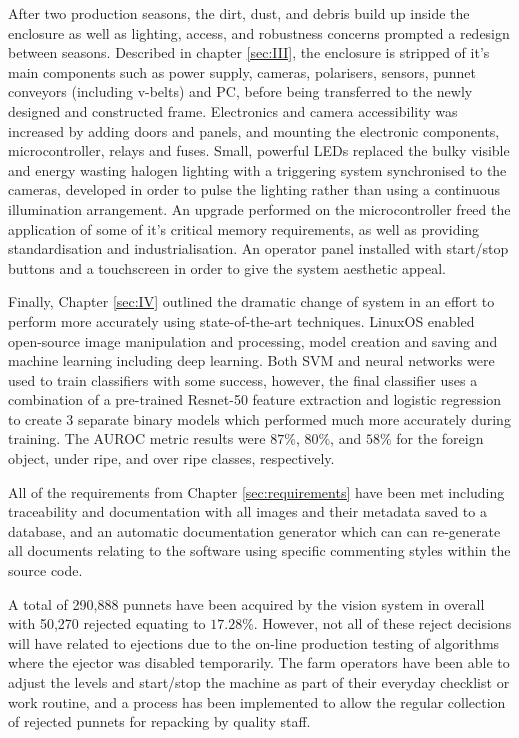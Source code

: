 \documentclass[fleqn,twoside,12pt]{report}
\begin{document}
After two production seasons, the dirt, dust, and debris build up inside the enclosure as well as lighting, access, and robustness concerns prompted a redesign between seasons. Described in chapter \ref{sec:III}, the enclosure is stripped of it's main components such as power supply, cameras, polarisers, sensors, punnet conveyors (including v-belts) and PC, before being transferred to the newly designed and constructed frame. Electronics and camera accessibility was increased by adding doors and panels, and mounting the electronic components, microcontroller, relays and fuses. Small, powerful LEDs replaced the bulky visible and energy wasting halogen lighting with a triggering system synchronised to the cameras, developed in order to pulse the lighting rather than using a continuous illumination arrangement. An upgrade performed on the microcontroller freed the application of some of it's critical memory requirements, as well as providing standardisation and industrialisation. An operator panel installed with start/stop buttons and a touchscreen in order to give the system aesthetic appeal. 

Finally, Chapter \ref{sec:IV} outlined the dramatic change of system in an effort to perform more accurately using state-of-the-art techniques. Linux\textregistered OS enabled open-source image manipulation and processing, model creation and saving and machine learning including deep learning. Both SVM and neural networks were used to train classifiers with some success, however, the final classifier uses a combination of a pre-trained Resnet-50 feature extraction and logistic regression to create 3 separate binary models which performed much more accurately during training. The AUROC metric results were $87\%$, $80\%$, and $58\%$ for the foreign object, under ripe, and over ripe classes, respectively. 

All of the requirements from Chapter \ref{sec:requirements} have been met including traceability and documentation with all images and their metadata saved to a database, and an automatic documentation generator which can can re-generate all documents relating to the software using specific commenting styles within the source code.

A total of 290,888 punnets have been acquired by the vision system in overall with 50,270 rejected equating to $17.28\%$. However, not all of these reject decisions will have related to ejections due to the on-line production testing of algorithms where the ejector was disabled temporarily. The farm operators have been able to adjust the levels and start/stop the machine as part of their everyday checklist or work routine, and a process has been implemented to allow the regular collection of rejected punnets for repacking by quality staff.
\end{document}
